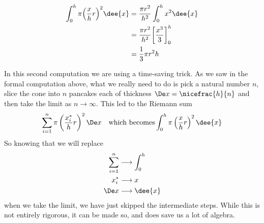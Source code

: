 \begin{eg}[Cone]
\begin{itemize}
\begin{align*}
\int_0^h \pi \Big(\frac{x}{h}r\Big)^2\dee{x}
&=\frac{\pi r^2}{h^2}\int_0^h x^2\dee{x}\\
&=\frac{\pi r^2}{h^2} \bigg[\frac{x^3}{3}\bigg]_0^h\\
&=\frac{1}{3}\pi r^2 h
\end{align*}
\end{itemize}
In this second computation we are using a time-saving trick. As we saw in
the formal computation above, what we really need to do is pick a natural number $n$,
slice the cone into $n$ pancakes each of thickness $\De x = \nicefrac{h}{n}$ and then
take the limit as $n \to \infty$. This led to the Riemann sum
\begin{align*}
  \sum_{i=1}^n \pi \left( \frac{x_i^*}{h} r \right)^2 \De x && \text{which becomes}
  \int_0^h \pi \left( \frac{x}{h} r \right)^2 \dee{x}
\end{align*}
So knowing that we will replace
\begin{align*}
  \sum_{i=1}^n &\longrightarrow \int_0^h\\
  x_i^* &\longrightarrow x\\
  \De x &\longrightarrow \dee{x}
\end{align*}
when we take the limit, we have just skipped the intermediate steps. While this is not
entirely rigorous, it can be made so, and does save us a lot of algebra.
\end{eg}

